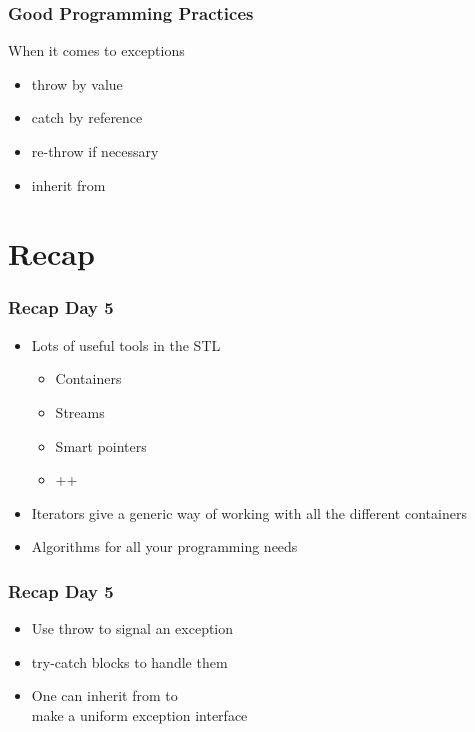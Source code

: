 \documentclass[14pt,a4paper,dvipsnames,usenames]{beamer}
\begin{document}
\begin{frame}
  \frametitle{Good Programming Practices}

  When it comes to exceptions

  \vspace{.5em}
  \begin{itemize}
    \setlength\itemsep{0.75em}
    \item throw by value
    \item catch by reference
    \item re-throw if necessary
    \item inherit from 
  \end{itemize}
  
\end{frame}

\section{Recap}

\frame[plain]{\sectionpage}

\begin{frame}
  \frametitle{Recap Day 5}

  \begin{itemize}
    \setlength\itemsep{0.75em}
    \item Lots of useful tools in the STL
    \vspace{.25em}
    \begin{itemize}
      \setlength\itemsep{.25em}
      \item Containers
      \item Streams
      \item Smart pointers
      \item ++
    \end{itemize}
    \item Iterators give a generic way of working with all the different containers
    \item Algorithms for all your programming needs
  \end{itemize}

\end{frame}

\begin{frame}
  \frametitle{Recap Day 5}

  \begin{itemize}
    \setlength\itemsep{0.75em}
    \item Use {\color{FeebleWeek}throw} to signal an exception
    \item {\color{FeebleWeek}try}-{\color{FeebleWeek}catch} blocks to handle them
    \item One can inherit from  to\\make a uniform exception interface
  \end{itemize}

\end{frame}
\end{document}
